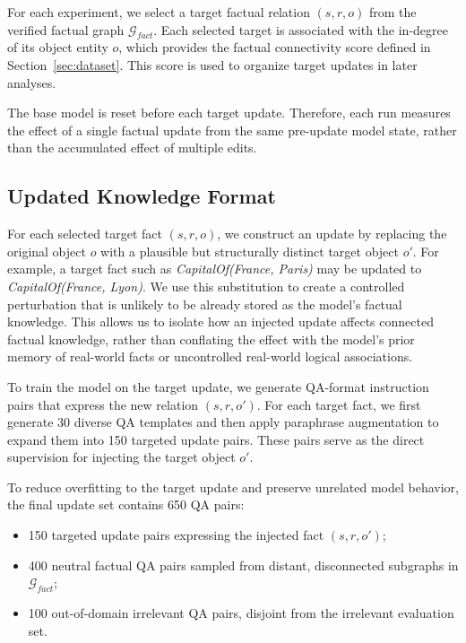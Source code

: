 For each experiment, we select a target factual relation $(s,r,o)$ from the verified factual graph $\mathcal{G}_{fact}$. Each selected target is associated with the in-degree of its object entity $o$, which provides the factual connectivity score defined in Section~\ref{sec:dataset}. This score is used to organize target updates in later analyses.

The base model is reset before each target update. Therefore, each run measures the effect of a single factual update from the same pre-update model state, rather than the accumulated effect of multiple edits.


\subsection{Updated Knowledge Format}

For each selected target fact $(s,r,o)$, we construct an update by replacing the original object $o$ with a plausible but structurally distinct target object $o'$. For example, a target fact such as \textit{CapitalOf(France, Paris)} may be updated to \textit{CapitalOf(France, Lyon)}. We use this substitution to create a controlled perturbation that is unlikely to be already stored as the model's factual knowledge. This allows us to isolate how an injected update affects connected factual knowledge, rather than conflating the effect with the model's prior memory of real-world facts or uncontrolled real-world logical associations.

To train the model on the target update, we generate QA-format instruction pairs that express the new relation $(s,r,o')$. For each target fact, we first generate 30 diverse QA templates and then apply paraphrase augmentation to expand them into 150 targeted update pairs. These pairs serve as the direct supervision for injecting the target object $o'$.

To reduce overfitting to the target update and preserve unrelated model behavior, the final update set contains 650 QA pairs:

\begin{itemize}
    \setlength\itemsep{0em}
    \item 150 targeted update pairs expressing the injected fact $(s,r,o')$;
    \item 400 neutral factual QA pairs sampled from distant, disconnected subgraphs in $\mathcal{G}_{fact}$;
    \item 100 out-of-domain irrelevant QA pairs, disjoint from the irrelevant evaluation set.
\end{itemize}

